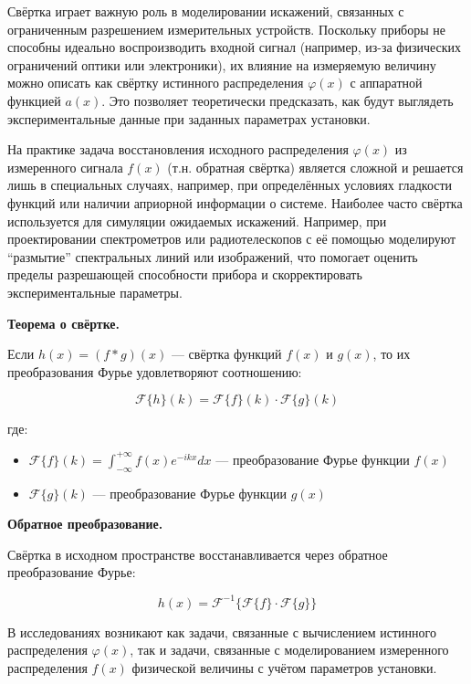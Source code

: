 \documentclass[a4paper]{article}
\begin{document}
Свёртка играет важную роль в моделировании искажений, связанных с ограниченным разрешением измерительных устройств.
Поскольку приборы не способны идеально воспроизводить входной сигнал (например, из-за физических ограничений оптики или
электроники), их влияние на измеряемую величину можно описать как свёртку истинного распределения $\varphi
\left(x\right)$ с аппаратной функцией $a\left(x\right)$. Это позволяет теоретически предсказать, как будут выглядеть
экспериментальные данные при заданных параметрах установки.

На практике задача восстановления исходного распределения $\varphi \left(x\right)$ из измеренного сигнала 
$f\left(x\right)$ (т.н. обратная свёртка) является сложной и решается лишь в специальных случаях, например, при
определённых условиях гладкости функций или наличии априорной информации о системе. Наиболее часто свёртка используется
для симуляции ожидаемых искажений. Например, при проектировании спектрометров или радиотелескопов с её помощью
моделируют ``размытие'' спектральных линий или изображений, что помогает оценить пределы
разрешающей способности прибора и скорректировать экспериментальные параметры.

\textbf{Теорема о свёртке.}

Если $h(x) = (f \ast g)(x)$ --- свёртка функций $f(x)$ и $g(x)$, то их преобразования Фурье удовлетворяют соотношению:

\begin{equation}
\mathcal{F}\{h\}(k) = \mathcal{F}\{f\}(k) \cdot \mathcal{F}\{g\}(k)
\end{equation}

где:
\begin{itemize}
\item $\mathcal{F}\{f\}(k) = \int_{-\infty}^{+\infty} f(x)e^{-ikx}dx$ --- преобразование Фурье функции $f(x)$
\item $\mathcal{F}\{g\}(k)$ --- преобразование Фурье функции $g(x)$
\end{itemize}

\textbf{Обратное преобразование.}

Свёртка в исходном пространстве восстанавливается через обратное преобразование Фурье:

\begin{equation}
h(x) = \mathcal{F}^{-1}\{\mathcal{F}\{f\} \cdot \mathcal{F}\{g\}\}
\end{equation}

В исследованиях возникают как задачи, связанные с вычислением истинного распределения $\varphi \left(x\right)$, так и
задачи, связанные с моделированием измеренного распределения $f\left(x\right)$ физической величины с учётом параметров
установки.
\end{document}
